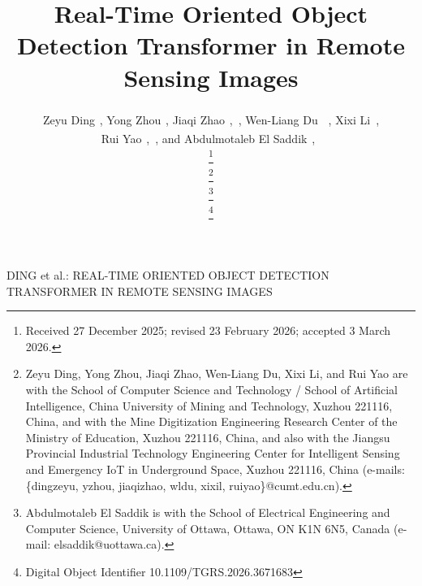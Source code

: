 \documentclass[lettersize,journal]{IEEEtran}
\begin{document}
\title{Real-Time Oriented Object Detection Transformer in Remote Sensing Images}

\author{
Zeyu Ding\textsuperscript{~}, 
Yong Zhou\textsuperscript{~}, 
Jiaqi Zhao\textsuperscript{~},~, 
Wen-Liang Du\textsuperscript{~}~, 
Xixi Li~, \\
Rui Yao\textsuperscript{~},~, 
and Abdulmotaleb El Saddik\textsuperscript{~},~


\thanks{Received 27 December 2025; revised 23 February 2026; accepted 3 March 2026.}

\thanks{Zeyu Ding, Yong Zhou, Jiaqi Zhao, Wen-Liang Du, Xixi Li, and Rui Yao are with the School of Computer Science and Technology / School of Artificial Intelligence, China University of Mining and Technology, Xuzhou 221116, China, and with the Mine Digitization Engineering Research Center of the Ministry of Education, Xuzhou 221116, China, and also with the Jiangsu Provincial Industrial Technology Engineering Center for Intelligent Sensing and Emergency IoT in Underground Space, Xuzhou 221116, China (e-mails: \{dingzeyu, yzhou, jiaqizhao, wldu, xixil, ruiyao\}@cumt.edu.cn).}

\thanks{Abdulmotaleb El Saddik is with the School of Electrical Engineering and Computer Science, University of Ottawa, Ottawa, ON K1N 6N5, Canada (e-mail: elsaddik@uottawa.ca).}

\thanks{Digital Object Identifier 10.1109/TGRS.2026.3671683}
}

%
{DING et al.: REAL-TIME ORIENTED OBJECT DETECTION TRANSFORMER IN REMOTE SENSING IMAGES}



\maketitle
\end{document}
